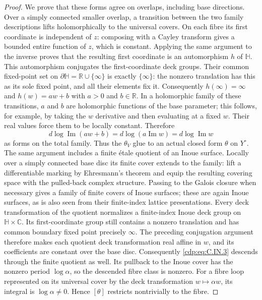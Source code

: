 \begin{proof}
We prove that these forms agree on overlaps, including base
directions. Over a simply connected smaller overlap, a transition
between the two family descriptions lifts holomorphically to the
universal covers. On each fibre its first coordinate is independent
of $z$: composing with a Cayley transform gives a bounded entire
function of $z$, which is constant. Applying the same argument to
the inverse proves that the resulting first coordinate is an
automorphism $h$ of $\mathbb H$. This automorphism conjugates the
first-coordinate deck groups. Their common fixed-point set on
$\partial\mathbb H=\mathbb R\cup\{\infty\}$ is exactly
$\{\infty\}$: the nonzero translation has this as its sole fixed
point, and all their elements fix it. Consequently $h(\infty)=
\infty$ and $h(w)=a w+b$ with $a>0$ and $b\in\mathbb R$.
In a holomorphic family of these transitions, $a$ and $b$ are
holomorphic functions of the base parameter; this follows, for
example, by taking the $w$ derivative and then evaluating at a
fixed $w$. Their real values force them to be locally constant.
Therefore
\[
 d\log\operatorname{Im}(a w+b)
 =d\log(a\operatorname{Im}w)
 =d\log\operatorname{Im}w
\tag{C.IN.4}\label{cdp:eq:C.IN.4}
\]
as forms on the total family. Thus the $\theta_V$ glue to an
actual closed form $\theta$ on $Y^\circ$.
The same argument includes a finite \'etale quotient of an Inoue
surface. Locally over a simply connected base disc its finite
cover extends to the family: lift a differentiable marking by
Ehresmann's theorem and equip the resulting covering space with
the pulled-back complex structure. Passing to the Galois closure
when necessary gives a family of finite covers of Inoue surfaces;
these are again Inoue surfaces, as is also seen from their
finite-index lattice presentations. Every deck transformation of
the quotient normalizes a finite-index Inoue deck group on
$\mathbb H\times\mathbb C$. Its first-coordinate group still
contains a nonzero translation and has common boundary fixed
point precisely $\infty$. The preceding conjugation argument
therefore makes each quotient deck transformation real affine in
$w$, and its coefficients are constant over the base disc.
Consequently \eqref{cdp:eq:C.IN.3} descends through the finite quotient as
well. Its pullback to the Inoue cover has the nonzero period
$\log\alpha$, so the descended fibre class is nonzero.
For a fibre loop represented on its universal cover by the deck
transformation $w\mapsto\alpha w$, its integral is
$\log\alpha\ne0$. Hence $[\theta]$ restricts nontrivially to
the fibre.


\end{proof}
